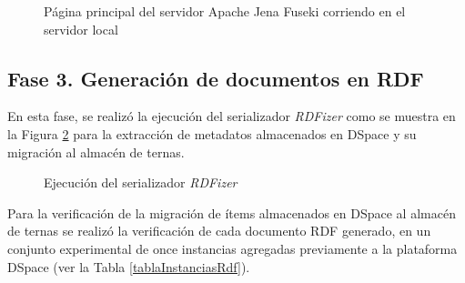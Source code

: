\begin{figure}[!ht]
	\centering
    \caption{P\'agina principal del servidor Apache Jena Fuseki corriendo en el servidor local}
    \label{jenaFusekiCorriendo}
\end{figure}

\subsection{Fase 3. Generaci\'on de documentos en RDF}

En esta fase, se realiz\'o la ejecuci\'on del serializador \textit{RDFizer} como se muestra en la Figura \ref{ejecucionRdfizer} para la extracci\'on de metadatos almacenados en DSpace y su migraci\'on al almac\'en de ternas.

\begin{figure}[!ht]
	\centering
    \caption{Ejecuci\'on del serializador \textit{RDFizer}}
    \label{ejecucionRdfizer}
\end{figure}

Para la verificaci\'on de la migraci\'on de \'items almacenados en DSpace al almac\'en de ternas se realiz\'o la verificaci\'on de cada  documento RDF generado, en un conjunto experimental de once instancias agregadas previamente a la plataforma DSpace (ver la Tabla \ref{tablaInstanciasRdf}).

